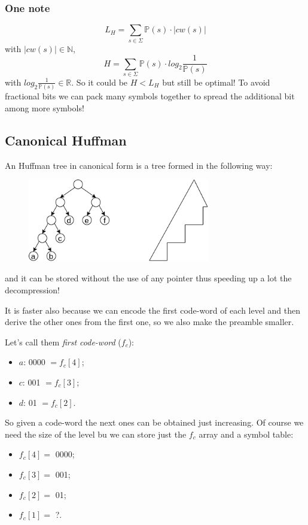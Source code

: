 \subsubsection{One note}
$$
    L_H = \sum_{s \in \Sigma}\mathbb{P}(s) \cdot |cw(s)|
$$
with $|cw(s)| \in \mathbb{N}$,
$$
    H = \sum_{s \in \Sigma}\mathbb{P}(s) \cdot log_2 \frac{1}{\mathbb{P}(s)}
$$
with $log_2 \frac{1}{\mathbb{P}(s)} \in \mathbb{R}$.
So it could be $H < L_H$ but still be optimal!
To avoid fractional bits we can pack many symbols together to spread the additional bit among more symbols!

\subsection{Canonical Huffman}
An Huffman tree in canonical form is a tree formed in the following way:
\begin{figure}[H]
    \centering
    \includegraphics[width=300px]{images/10_Data_compression/canonical_huffman.png}
\end{figure}
and it can be stored without the use of any pointer thus speeding up a lot the decompression!

It is faster also because we can encode the first code-word of each level and then derive the other ones from the first one, so we also make the preamble smaller.

Let's call them \emph{first code-word} ($f_c$):
\begin{itemize}
    \item $a$: 0000 $ = f_c[4]$;
    \item $c$: 001 $ = f_c[3]$;
    \item $d$: 01 $ = f_c[2]$.
\end{itemize}

So given a code-word the next ones can be obtained just increasing.
Of course we need the size of the level bu we can store just the $f_c$ array and a symbol table:
\begin{itemize}
    \item $f_c[4] = $ 0000;
    \item $f_c[3] = $ 001;
    \item $f_c[2] = $ 01;
    \item $f_c[1] = $ ?.
\end{itemize}

